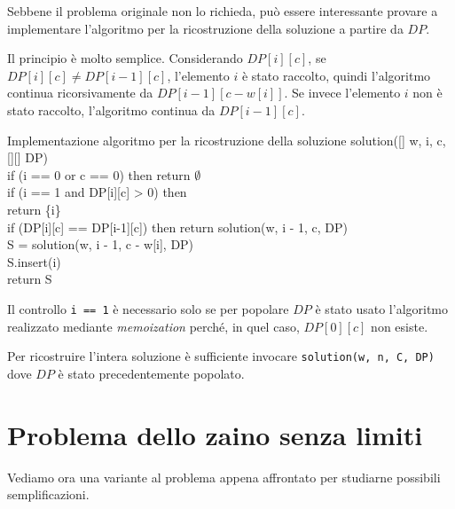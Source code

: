 \noindent Sebbene il problema originale non lo richieda, può essere interessante
provare a implementare l'algoritmo per la ricostruzione della soluzione a partire
da $DP$.

Il principio è molto semplice. Considerando $DP[i][c]$, se $DP[i][c]\neq
DP[i-1][c]$, l'elemento $i$ è stato raccolto, quindi l'algoritmo continua
ricorsivamente da $DP[i-1][c-w[i]]$. Se invece l'elemento $i$ non è stato
raccolto, l'algoritmo continua da $DP[i-1][c]$.

\begin{minicode}{Implementazione algoritmo per la ricostruzione della soluzione}
\ind{} solution([] w,  i,  c, [][] DP)\\
    \indf if (i == 0 or c == 0) then\hfill{}
        return $\emptyset$\\
    \indf if (i == 1 and DP[i][c] > 0) then\\
        return \{i\}\\
    \indf if (DP[i][c] == DP[i-1][c]) then\hfill{}
        return solution(w, i - 1, c, DP)\\
    \indf {} S = solution(w, i - 1, c - w[i], DP)\\
    \indf S.insert(i)\\
    \indf return S
\end{minicode}
\begin{note}
    Il controllo \texttt{i == 1} è necessario solo se per popolare $DP$ è stato
    usato l'algoritmo realizzato mediante \emph{memoization} perché, in quel
    caso, $DP[0][c]$ non esiste.
\end{note}\noindent
Per ricostruire l'intera soluzione è sufficiente invocare \texttt{solution(w, n,
C, DP)} dove $DP$ è stato precedentemente popolato.

\section{Problema dello zaino senza limiti}
Vediamo ora una variante al problema appena affrontato per studiarne possibili
semplificazioni.

